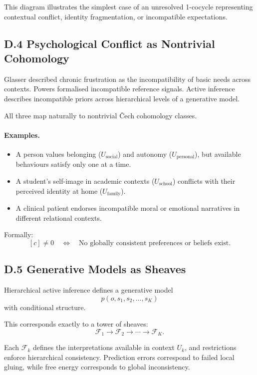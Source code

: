 \documentclass[11pt,a4paper,twoside]{article}
\begin{document}
This diagram illustrates the simplest case of an unresolved 1-cocycle representing contextual conflict, identity fragmentation, or incompatible expectations.

\subsection*{D.4 Psychological Conflict as Nontrivial Cohomology}

Glasser described chronic frustration as the incompatibility of basic needs across contexts. Powers formalised incompatible reference signals. Active inference describes incompatible priors across hierarchical levels of a generative model.

All three map naturally to nontrivial Čech cohomology classes.

\paragraph{Examples.}
\begin{itemize}
\item A person values belonging ($U_{\text{social}}$) and autonomy ($U_{\text{personal}}$), but available behaviours satisfy only one at a time.
\item A student’s self-image in academic contexts ($U_{\text{school}}$) conflicts with their perceived identity at home ($U_{\text{family}}$).
\item A clinical patient endorses incompatible moral or emotional narratives in different relational contexts.
\end{itemize}

Formally:
\[
[c] \neq 0 \quad \Longleftrightarrow \quad \text{No globally consistent preferences or beliefs exist.}
\]

\subsection*{D.5 Generative Models as Sheaves}

Hierarchical active inference defines a generative model
\[
p(o, s_1, s_2, \dots, s_K)
\]
with conditional structure.

This corresponds exactly to a tower of sheaves:
\[
\mathscr{F}_1 \to \mathscr{F}_2 \to \cdots \to \mathscr{F}_K.
\]

Each $\mathscr{F}_k$ defines the interpretations available in context $U_k$, and restrictions enforce hierarchical consistency. Prediction errors correspond to failed local gluing, while free energy corresponds to global inconsistency.
\end{document}
